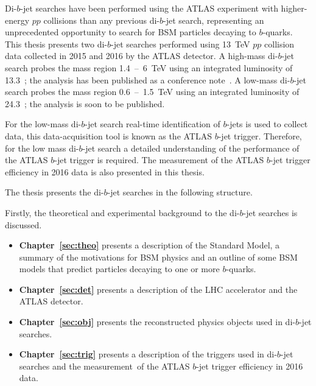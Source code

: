 Di-$b$-jet searches have been performed using the ATLAS experiment
with higher-energy $pp$ collisions than any previous \mbox{di-$b$-jet} search,
representing an unprecedented opportunity to search for BSM particles decaying to $b$-quarks.
This thesis presents two di-$b$-jet searches performed using
13~TeV $pp$ collision data collected in 2015 and 2016 by the ATLAS detector.
A high-mass di-$b$-jet search probes the mass region 1.4~--~6~TeV using an integrated luminosity of 13.3~\ifb{};
the analysis has been published as a conference note~\cite{dibjet-ichep_conf}.
A low-mass di-$b$-jet search probes the mass region 0.6~--~1.5~TeV using an integrated luminosity of 24.3~\ifb{};
the analysis is soon to be published.

For the low-mass di-$b$-jet search real-time identification of $b$-jets is used to collect data,
this data-acquisition tool is known as the ATLAS $b$-jet trigger.
Therefore, for the low mass di-$b$-jet search a detailed understanding of the performance of the ATLAS $b$-jet trigger is required.
The measurement of the ATLAS $b$-jet trigger efficiency in 2016 data is also presented in this thesis.

%
\noindent
The thesis presents the di-$b$-jet searches in the following structure.\vspace{-0.5em}

\noindent
Firstly, the theoretical and experimental background to the di-$b$-jet searches is discussed.
\vspace{-0.5em}
\begin{itemize}[leftmargin=*]
\item\textbf{Chapter~\ref{sec:theo}} presents a description of the Standard Model,
  a summary of the motivations for BSM physics and
  an outline of some BSM models that predict particles
  decaying to one or more $b$-quarks.%
\item\textbf{Chapter~\ref{sec:det}} presents a description of the LHC accelerator and the ATLAS detector.%
\item\textbf{Chapter~\ref{sec:obj}} presents the reconstructed physics objects used in di-$b$-jet searches. %
\item\textbf{Chapter~\ref{sec:trig}} presents a description of the triggers used in di-$b$-jet searches
  and the measurement~of the ATLAS $b$-jet trigger efficiency in 2016 data. %
\end{itemize}


